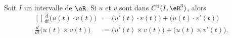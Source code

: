 \begin{proposition}     \label{PROPooFKKHooQZGXhE}
	Soit \( I\) un intervalle de \( \eR\). Si \( u\) et \( v\) sont dans \( C^1(I,\eR^3)\), alors
	\begin{equation}	\label{EqFormLeibProdscalVect}
		\begin{aligned}[]
			\frac{ d }{ dt }\big( u(t)\cdot v(t) \big)  & =\big( u'(t)\cdot v(t) \big)+\big( u(t)\cdot v'(t) \big)    \\
			\frac{ d }{ dt }\big( u(t)\times v(t) \big) & =\big( u'(t)\times v(t) \big)+\big( u(t)\times v'(t) \big).
		\end{aligned}
	\end{equation}
\end{proposition}

